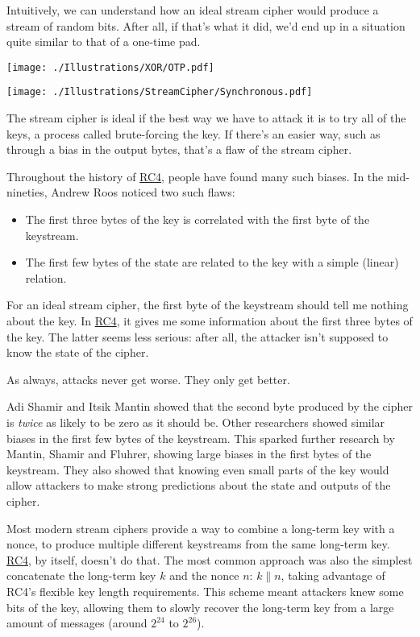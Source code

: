 \documentclass[11pt,ebook,table,dvipsnames]{memoir}
\begin{document}
Intuitively, we can understand how an ideal stream cipher would
produce a stream of random bits. After all, if that's what it did,
we'd end up in a situation quite similar to that of a one-time pad.

\texttt{[image: ./Illustrations/XOR/OTP.pdf]}

\texttt{[image: ./Illustrations/StreamCipher/Synchronous.pdf]}

The stream cipher is ideal if the best way we have to attack it is to
try all of the keys, a process called brute-forcing the key. If
there's an easier way, such as through a bias in the output bytes,
that's a flaw of the stream cipher.

Throughout the history of \hyperref[RC4]{RC4}, people have found many such biases. In
the mid-nineties, Andrew Roos noticed two such flaws:

\begin{itemize}
\item The first three bytes of the key is correlated with the first byte
of the keystream.
\item The first few bytes of the state are related to the key with a
simple (linear) relation.
\end{itemize}

For an ideal stream cipher, the first byte of the keystream should
tell me nothing about the key. In \hyperref[RC4]{RC4}, it gives me some information
about the first three bytes of the key. The latter seems less serious:
after all, the attacker isn't supposed to know the state of the
cipher.

As always, attacks never get worse. They only get better.

Adi Shamir and Itsik Mantin showed that the second byte produced by
the cipher is \emph{twice} as likely to be zero as it should be. Other
researchers showed similar biases in the first few bytes of the
keystream. This sparked further research by Mantin, Shamir and
Fluhrer\cite{fms:rc4}, showing large biases in the first bytes of the
keystream. They also showed that knowing even small parts of the key
would allow attackers to make strong predictions about the state and
outputs of the cipher.

Most modern stream ciphers provide a way to combine a long-term key
with a \gls{nonce}, to produce multiple different keystreams from the
same long-term key. \hyperref[RC4]{RC4}, by itself, doesn't do that. The most common
approach was also the simplest concatenate the long-term key $k$ and
the nonce $n$: $k \| n$, taking advantage of RC4's flexible key length
requirements. This scheme meant attackers knew some bits of the key,
allowing them to slowly recover the long-term key from a large amount
of messages (around $2^{24}$ to $2^{26}$).
\end{document}
